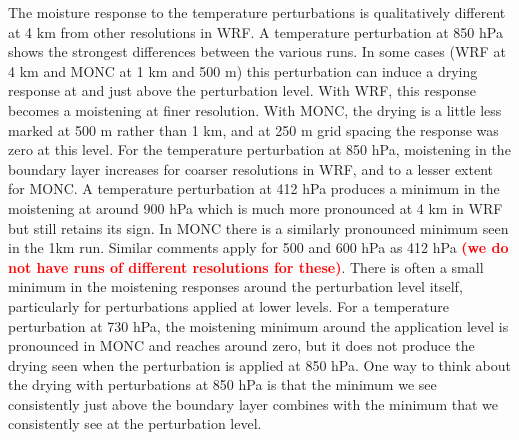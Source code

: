 \documentclass[draft]{agujournal2019}
\newcommand{\todo}[1]{\textcolor{red}{\textbf{(#1)}}}
\begin{document}
The moisture response to the temperature perturbations is qualitatively
different at 4 km from other resolutions in WRF. A temperature perturbation at
850 hPa shows the strongest differences between the various runs. In some cases
(WRF at 4 km and MONC at 1 km and 500 m) this perturbation can induce a drying
response at and just above the perturbation level. With WRF, this response
becomes a moistening at finer resolution. With MONC, the drying is a little less
marked at 500 m rather than 1 km, and at 250 m grid spacing the response was
zero at this level. For the temperature perturbation at 850 hPa, moistening in
the boundary layer increases for coarser resolutions in WRF, and to a lesser
extent for MONC. A temperature perturbation at 412 hPa produces a minimum in the
moistening at around 900 hPa which is much more pronounced at 4 km in WRF but
still retains its sign. In MONC there is a similarly pronounced minimum seen in
the 1km run. Similar comments apply for 500 and 600 hPa as 412 hPa \todo{we do
not have runs of different resolutions for these}. There is often a small
minimum in the moistening responses around the perturbation level itself,
particularly for perturbations applied at lower levels. For a temperature
perturbation at 730 hPa, the moistening minimum around the application level is
pronounced in MONC and reaches around zero, but it does not produce the drying
seen when the perturbation is applied at 850 hPa. One way to think about the
drying with perturbations at 850 hPa is that the minimum we see consistently
just above the boundary layer combines with the minimum that we consistently see
at the perturbation level.
\end{document}
